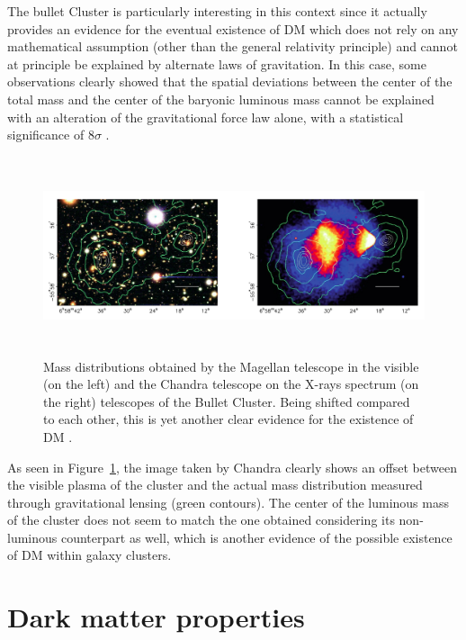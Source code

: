 \documentclass[a4paper, 10pt, openright]{report}
\begin{document}
The bullet Cluster is particularly interesting in this context since it actually provides an evidence for the eventual existence of \ac{DM} which does not rely on any mathematical assumption (other than the general relativity principle) and cannot at principle be explained by alternate laws of gravitation. In this case, some observations clearly showed that the spatial deviations between the center of the total mass and the center of the baryonic luminous mass cannot be explained with an alteration of the gravitational force law alone, with a statistical significance of $8 \sigma$ \cite{BulletClusterSigma}.

\begin{figure}[htbp]
\begin{center}
\includegraphics[width=14.2cm, height=5.8cm]{figs/BulletCluster.png}
\caption{Mass distributions obtained by the Magellan telescope in the visible (on the left) and the Chandra telescope on the X-rays spectrum (on the right) telescopes of the Bullet Cluster. Being shifted compared to each other, this is yet another clear evidence for the existence of \ac{DM} \cite{BulletClusterSigma}.}
\label{figure:BulletCluster}
\end{center}
\end{figure}

As seen in Figure~\ref{figure:BulletCluster}, the image taken by Chandra clearly shows an offset between the visible plasma of the cluster and the actual mass distribution measured through gravitational lensing (green contours). The center of the luminous mass of the cluster does not seem to match the one obtained considering its non-luminous counterpart as well, which is another evidence of the possible existence of \ac{DM} within galaxy clusters.

\section{Dark matter properties} \label{section:DMProperties}
\end{document}
